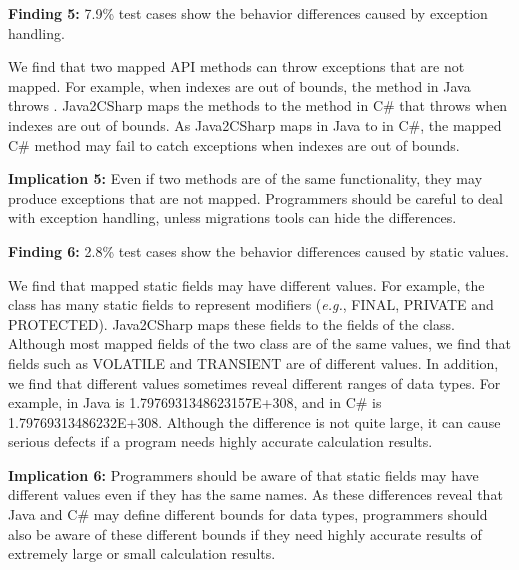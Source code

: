 \textbf{Finding 5:} 7.9\% test cases show the behavior differences caused by exception handling.

We find that two mapped API methods can throw exceptions that are not mapped. For example, when indexes are out of bounds, the  method in Java throws . Java2CSharp maps the methods to the  method in C\# that throws  when indexes are out of bounds. As Java2CSharp maps  in Java to  in C\#, the mapped C\# method may fail to catch exceptions when indexes are out of bounds.

\textbf{Implication 5:} Even if two methods are of the same functionality, they may produce exceptions that are not mapped. Programmers should be careful to deal with exception handling, unless migrations tools can hide the differences.



\textbf{Finding 6:} 2.8\% test cases show the behavior differences caused by static values.

We find that mapped static fields may have different values. For example, the  class has many static fields to represent modifiers (\emph{e.g.}, FINAL, PRIVATE and PROTECTED). Java2CSharp maps these fields to the fields of the  class. Although most mapped fields of the two class are of the same values, we find that fields such as VOLATILE and TRANSIENT are of different values. In addition, we find that different values sometimes reveal different ranges of data types. For example,  in Java is 1.7976931348623157E+308, and  in C\# is 1.79769313486232E+308. Although the difference is not quite large, it can cause serious defects if a program needs highly accurate calculation results.

\textbf{Implication 6:} Programmers should be aware of that static fields may have different values even if they has the same names. As these differences reveal that Java and C\# may define different bounds for data types, programmers should also be aware of these different bounds if they need highly accurate results of extremely large or small calculation results.

